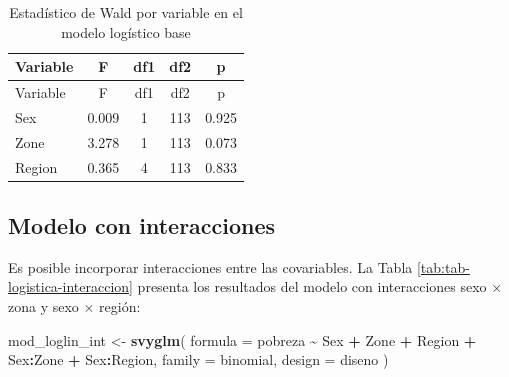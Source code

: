 \documentclass[
  spanish,
  12pt,
]{book}
\newenvironment{Shaded}{\begin{snugshade}}{\end{snugshade}}
\newcommand{\AttributeTok}[1]{\textcolor[rgb]{0.13,0.29,0.53}{#1}}
\newcommand{\FunctionTok}[1]{\textcolor[rgb]{0.13,0.29,0.53}{\textbf{#1}}}
\newcommand{\NormalTok}[1]{#1}
\newcommand{\OtherTok}[1]{\textcolor[rgb]{0.56,0.35,0.01}{#1}}
\newcommand{\SpecialCharTok}[1]{\textcolor[rgb]{0.81,0.36,0.00}{\textbf{#1}}}
\begin{document}
\begin{longtable}[]{@{}lcccc@{}}
\caption{\label{tab:tab-wald-logistica}Estadístico de Wald por variable en el modelo logístico base}\tabularnewline
\toprule\noalign{}
Variable & F & df1 & df2 & p \\
\midrule\noalign{}
\endfirsthead
\toprule\noalign{}
Variable & F & df1 & df2 & p \\
\midrule\noalign{}
\endhead
\bottomrule\noalign{}
\endlastfoot
Sex & 0.009 & 1 & 113 & 0.925 \\
Zone & 3.278 & 1 & 113 & 0.073 \\
Region & 0.365 & 4 & 113 & 0.833 \\
\end{longtable}

\subsection{Modelo con interacciones}\label{modelo-con-interacciones}

Es posible incorporar interacciones entre las covariables. La Tabla \ref{tab:tab-logistica-interaccion} presenta los resultados del modelo con interacciones sexo × zona y sexo × región:

\begin{Shaded}
\begin{Highlighting}[]
\NormalTok{mod\_loglin\_int }\OtherTok{\textless{}{-}} \FunctionTok{svyglm}\NormalTok{(}
  \AttributeTok{formula =}\NormalTok{ pobreza }\SpecialCharTok{\textasciitilde{}}\NormalTok{ Sex }\SpecialCharTok{+}\NormalTok{ Zone }\SpecialCharTok{+}\NormalTok{ Region }\SpecialCharTok{+}\NormalTok{ Sex}\SpecialCharTok{:}\NormalTok{Zone }\SpecialCharTok{+}\NormalTok{ Sex}\SpecialCharTok{:}\NormalTok{Region,}
  \AttributeTok{family  =}\NormalTok{ binomial,}
  \AttributeTok{design  =}\NormalTok{ diseno}
\NormalTok{)}
\end{Highlighting}
\end{Shaded}
\end{document}
